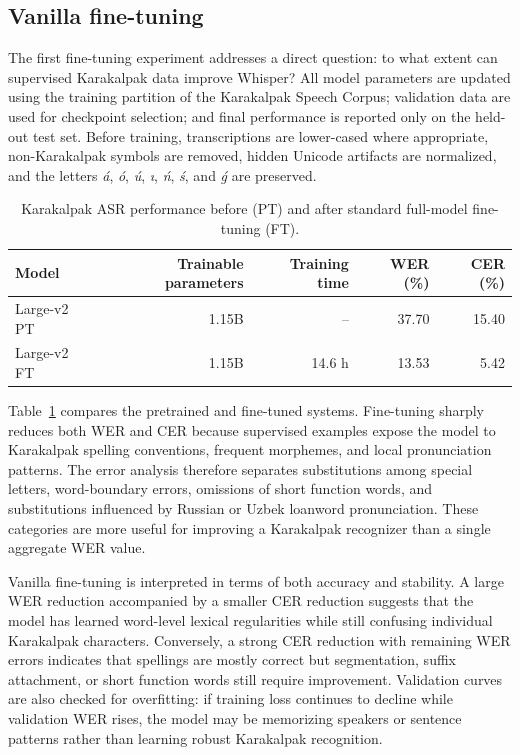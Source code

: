 \documentclass[11pt]{article}
\begin{document}
\subsection{Vanilla fine-tuning}

The first fine-tuning experiment addresses a direct question: to what extent can supervised Karakalpak data improve Whisper? All model parameters are updated using the training partition of the Karakalpak Speech Corpus; validation data are used for checkpoint selection; and final performance is reported only on the held-out test set. Before training, transcriptions are lower-cased where appropriate, non-Karakalpak symbols are removed, hidden Unicode artifacts are normalized, and the letters \textit{á}, \textit{ó}, \textit{ú}, \textit{ı}, \textit{ń}, \textit{ś}, and \textit{ǵ} are preserved.

\begin{table}[H]
\centering
\caption{Karakalpak ASR performance before (PT) and after standard full-model fine-tuning (FT).}
\label{tab:pt-ft}
\begin{tabular}{lrrrr}
\toprule
Model & Trainable parameters & Training time & WER (\%) & CER (\%) \\
\midrule
Large-v2 PT & 1.15B & -- & 37.70 & 15.40 \\
Large-v2 FT & 1.15B & 14.6 h & 13.53 & 5.42 \\
\bottomrule
\end{tabular}
\end{table}

Table~\ref{tab:pt-ft} compares the pretrained and fine-tuned systems. Fine-tuning sharply reduces both WER and CER because supervised examples expose the model to Karakalpak spelling conventions, frequent morphemes, and local pronunciation patterns. The error analysis therefore separates substitutions among special letters, word-boundary errors, omissions of short function words, and substitutions influenced by Russian or Uzbek loanword pronunciation. These categories are more useful for improving a Karakalpak recognizer than a single aggregate WER value.

Vanilla fine-tuning is interpreted in terms of both accuracy and stability. A large WER reduction accompanied by a smaller CER reduction suggests that the model has learned word-level lexical regularities while still confusing individual Karakalpak characters. Conversely, a strong CER reduction with remaining WER errors indicates that spellings are mostly correct but segmentation, suffix attachment, or short function words still require improvement. Validation curves are also checked for overfitting: if training loss continues to decline while validation WER rises, the model may be memorizing speakers or sentence patterns rather than learning robust Karakalpak recognition.
\end{document}
